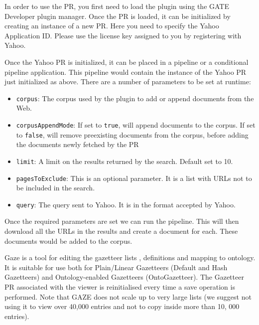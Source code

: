 
In order to use the PR, you first need to load the plugin using the
GATE Developer plugin manager. Once the PR is loaded, it can be
initialized by creating an instance of a new PR. Here you need to
specify the Yahoo Application ID. Please use the license key assigned
to you by registering with Yahoo.

Once the Yahoo PR is initialized, it can be placed in a pipeline 
or a conditional pipeline application. This pipeline would contain the instance 
of the Yahoo PR just initialized as above. There are a number of
parameters to be set at runtime:

\begin{itemize}
\item \verb|corpus|: The corpus used by the plugin to add or append
documents from the Web.

\item \verb|corpusAppendMode|: If set to \verb|true|, will append documents
to the corpus. If set to \verb|false|, will remove preexisting
documents from the corpus, before adding the documents newly fetched by the PR

\item \verb|limit|: A limit on the results returned by the search. Default set to
10.

\item \verb|pagesToExclude|: This is an optional parameter. It is a list with
URLs not to be included in the search.

\item \verb|query|: The query sent to Yahoo. It is in the format
accepted by Yahoo.

\end{itemize}

Once the required parameters are set we can run the pipeline. This
will then download all the URLs in the results and create a document
for each. These documents would be added to the corpus.



Gaze is a tool for editing the gazetteer lists , definitions and mapping to
ontology. It is suitable for use both for Plain/Linear Gazetteers (Default and
Hash Gazetteers) and Ontology-enabled Gazetteers (OntoGazetteer). The Gazetteer
PR associated with the viewer is reinitialised every time a save operation is
performed. Note that GAZE does not scale up to very large lists (we suggest not
using it to view over 40,000 entries and not to copy inside more than 10, 000
entries).

